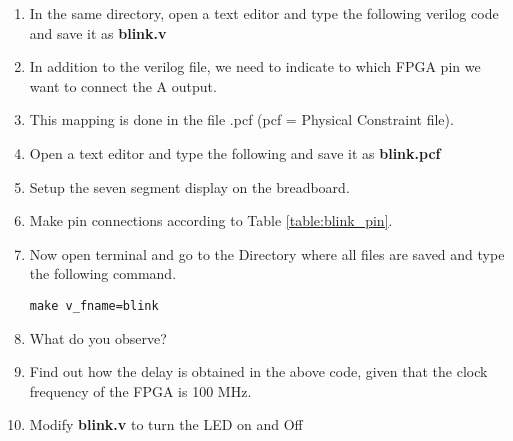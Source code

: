 \documentclass[journal,12pt,twocolumn]{IEEEtran}
\begin{document}
\begin{enumerate}
    \item In the same directory, open a text editor and type the following verilog code and save it as \textbf{blink.v}
        

    \item In addition to the verilog file, we need to indicate to which FPGA pin we want to connect the A output.
    \item This mapping is done in the file .pcf (pcf = Physical Constraint file).
    \item Open a text editor and type the following and save it as \textbf{blink.pcf}
        
\item Setup the seven segment display on the breadboard.
\item Make pin connections according to Table \ref{table:blink_pin}.

    
    
    
    \item Now open terminal and go to the Directory where all files are saved and type the following command.
    \begin{verbatim}
make v_fname=blink 
    \end{verbatim}
    \item What do you observe?
\item Find out how the delay is obtained in the above code, given that the clock frequency of the FPGA is 100 MHz.    
    \item Modify \textbf{blink.v} to turn the LED on and Off
\end{enumerate}
\end{document}
